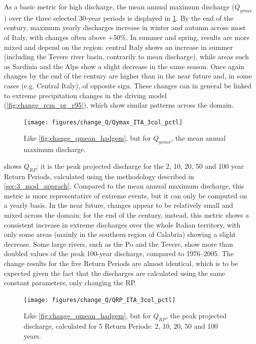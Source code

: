 As a basic metric for high discharge, the mean annual maximum discharge ($Q_{ymax}$) over the three selected 30-year periods is displayed in \cref{fig:change_qymax_hadgem}.
By the end of the century, maximum yearly discharges increase in winter and autumn across most of Italy, with changes often above $+50\%$.
In summer and spring, results are more mixed and depend on the region: central Italy shows an increase in summer (including the Tevere river basin, contrarily to mean discharge), while areas such as Sardinia and the Alps show a slight decrease in the same season.
Once again changes by the end of the century are higher than in the near future and, in some cases (e.g. Central Italy), of opposite sign.
These changes can in general be linked to extreme precipitation changes in the driving model (\cref{fig:change_rcm_pr_r95}), which show similar patterns across the domain.\\
\begin{figure}
    \centering
    \texttt{[image: figures/change\_Q/Qymax\_ITA\_3col\_pctl]}
    \decoRule
    \caption[Mean annual maximum discharge change in CHyM (HadGEM)]{
        Like \cref{fig:change_qmean_hadgem}, but for $Q_{ymax}$, the mean annual maximum discharge.
    } \label{fig:change_qymax_hadgem}
\end{figure}
 shows $Q_{RP}$: it is the peak projected discharge for the 2, 10, 20, 50 and 100 year Return Periods, calculated using the methodology described in \cref{sec:3_mod_apprach}.
Compared to the mean annual maximum discharge, this metric is more representative of extreme events, but it can only be computed on a yearly basis.
In the near future, changes appear to be relatively small and mixed across the domain; for the end of the century, instead, this metric shows a consistent increase in extreme discharges over the whole Italian territory, with only some areas (mainly in the southern region of Calabria) showing a slight decrease.
Some large rivers, such as the Po and the Tevere, show more than doubled values of the peak 100-year discharge, compared to 1976--2005.
The change results for the five Return Periods are almost identical, which is to be expected given the fact that the discharges are calculated using the same constant parameters, only changing the RP.
\begin{figure}
    \centering
    \texttt{[image: figures/change\_Q/QRP\_ITA\_3col\_pctl]}
    \decoRule
    \caption[Mean annual maximum discharge change in CHyM (HadGEM)]{
        Like \cref{fig:change_qmean_hadgem}, but for $Q_{RP}$, the peak projected discharge, calculated for 5 Return Periods: 2, 10, 20, 50 and 100 years.
    } \label{fig:change_qrp_hadgem}
\end{figure}
